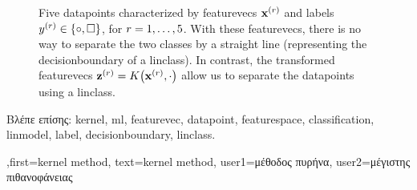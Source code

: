 {{\begin{figure}[H]
\begin{center}
\end{center}
\caption{
Five \gls{datapoint}s characterized by \gls{featurevec}s ${\bf x}^{(r)}$ 
and \gls{label}s $y^{(r)} \in \{ \circ, \square \}$, for $r=1,\ldots,5$. 
With these \gls{featurevec}s, there is no way to separate the two classes 
by a straight line (representing the \gls{decisionboundary} of a \gls{linclass}). 
In contrast, the transformed \gls{featurevec}s ${\bf z}^{(r)} = K\big({\bf x}^{(r)},\cdot\big)$ 
allow us to separate the \gls{datapoint}s using a \gls{linclass}.  \label{fig_linsep_kernel_dict}}
\end{figure}
\foreignlanguage{greek}{Βλέπε επίσης:} \gls{kernel}, \gls{ml}, \gls{featurevec}, \gls{datapoint}, \gls{featurespace}, \gls{classification}, \gls{linmodel}, \gls{label}, \gls{decisionboundary}, \gls{linclass}.
},first={kernel method},
text={kernel method},
user1={\foreignlanguage{greek}{μέθοδος πυρήνα}}, %
user2={\foreignlanguage{greek}{μέγιστης πιθανοφάνειας}} %
}


